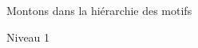 \documentclass[preview]{standalone}
\begin{document}
\begin{center}
Montons dans la hiérarchie des motifs
    
    Niveau 1
\end{center}
\end{document}
